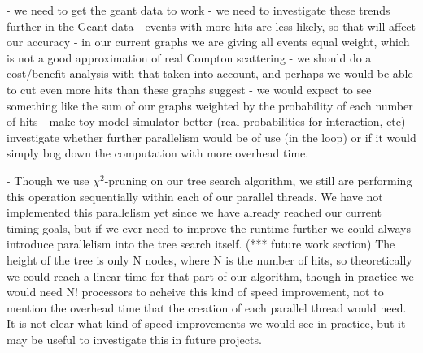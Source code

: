 - we need to get the geant data to work
- we need to investigate these trends further in the Geant data
    - events with more hits are less likely, so that will affect our accuracy
    - in our current graphs we are giving all events equal weight, which is not a good approximation of real Compton scattering
    - we should do a cost/benefit analysis with that taken into account, and perhaps we would be able to cut even more hits than these graphs suggest
    - we would expect to see something like the sum of our graphs weighted by the probability of each number of hits
- make toy model simulator better (real probabilities for interaction, etc)
- investigate whether further parallelism would be of use (in the loop) or if it would simply bog down the computation with more overhead time.

- Though we use $\chi^2$-pruning on our tree search algorithm, we still are performing this operation sequentially within each of our parallel threads. We have not implemented this parallelism yet since we have already reached our current timing goals, but if we ever need to improve the runtime further we could always introduce parallelism into the tree search itself. (*** future work section) The height of the tree is only N nodes, where N is the number of hits, so theoretically we could reach a linear time for that part of our algorithm, though in practice we would need N! processors to acheive this kind of speed improvement, not to mention the overhead time that the creation of each parallel thread would need. It is not clear what kind of speed improvements we would see in practice, but it may be useful to investigate this in future projects.

